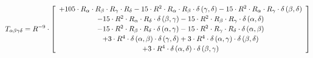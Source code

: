 \begin{subequations}\begin{gather}
T_{\alpha{}\beta{}\gamma{}\delta{}} = R^{-9} \cdot  \left[ \begin{array}{c} 
 		+ 105 \cdot R_{\alpha{}} \cdot R_{\beta{}} \cdot R_{\gamma{}} \cdot R_{\delta{}}- 15 \cdot R^{2} \cdot R_{\alpha{}} \cdot R_{\beta{}} \cdot \delta{}\left(\gamma{}, \delta{}\right)- 15 \cdot R^{2} \cdot R_{\alpha{}} \cdot R_{\gamma{}} \cdot \delta{}\left(\beta{}, \delta{}\right) 
 \\[0.2em] \notag 		 - 15 \cdot R^{2} \cdot R_{\alpha{}} \cdot R_{\delta{}} \cdot \delta{}\left(\beta{}, \gamma{}\right)- 15 \cdot R^{2} \cdot R_{\beta{}} \cdot R_{\gamma{}} \cdot \delta{}\left(\alpha{}, \delta{}\right) 
 \\[0.2em] \notag 		 - 15 \cdot R^{2} \cdot R_{\beta{}} \cdot R_{\delta{}} \cdot \delta{}\left(\alpha{}, \gamma{}\right)- 15 \cdot R^{2} \cdot R_{\gamma{}} \cdot R_{\delta{}} \cdot \delta{}\left(\alpha{}, \beta{}\right) 
 \\[0.2em] \notag 		 + 3 \cdot R^{4} \cdot \delta{}\left(\alpha{}, \beta{}\right) \cdot \delta{}\left(\gamma{}, \delta{}\right)+ 3 \cdot R^{4} \cdot \delta{}\left(\alpha{}, \gamma{}\right) \cdot \delta{}\left(\beta{}, \delta{}\right) 
 \\[0.2em] \notag 		 + 3 \cdot R^{4} \cdot \delta{}\left(\alpha{}, \delta{}\right) \cdot \delta{}\left(\beta{}, \gamma{}\right)
 \end{array}\right] 
\end{gather}\end{subequations}